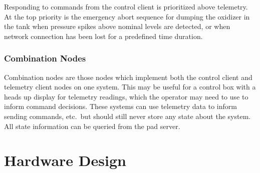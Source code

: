 Responding to commands from the control client is prioritized above telemetry. At the top priority is the emergency abort sequence for dumping the oxidizer in the tank when pressure spikes above nominal levels are detected, or when network connection has been lost for a predefined time duration.

\subsubsection{Combination Nodes}

Combination nodes are those nodes which implement both the control client and telemetry client nodes on one system. This may be useful for a control box with a heads up display for telemetry readings, which the operator may need to use to inform command decisions. These systems can use telemetry data to inform sending commands, etc.\ but should still never store any state about the system. All state information can be queried from the pad server.

\section{Hardware Design}
